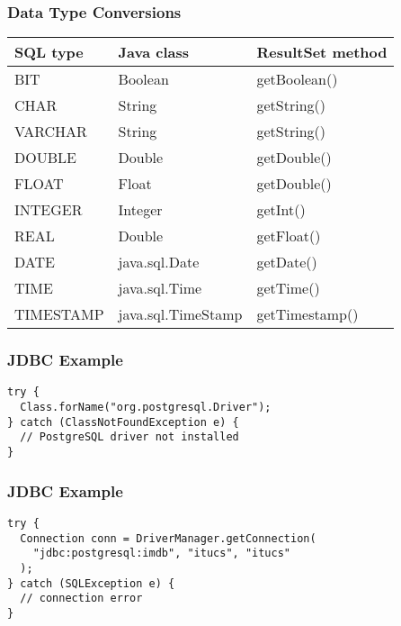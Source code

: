 \documentclass[dvipsnames]{beamer}
\theoremstyle{plain}
\begin{document}
\begin{frame}
  \frametitle{Data Type Conversions}

  \begin{table}
    \begin{tabular}{|l|l|l|}\hline
SQL type  & Java class         & ResultSet method\\\hline\hline
BIT       & Boolean            & getBoolean()    \\\hline
CHAR      & String             & getString()     \\\hline
VARCHAR   & String             & getString()     \\\hline
DOUBLE    & Double             & getDouble()     \\\hline
FLOAT     & Float              & getDouble()     \\\hline
INTEGER   & Integer            & getInt()        \\\hline
REAL      & Double             & getFloat()      \\\hline
DATE      & java.sql.Date      & getDate()       \\\hline
TIME      & java.sql.Time      & getTime()       \\\hline
TIMESTAMP & java.sql.TimeStamp & getTimestamp()  \\\hline
    \end{tabular}
  \end{table}
\end{frame}

\begin{frame}[fragile]
  \frametitle{JDBC Example}

  \begin{example}
    \begin{lstlisting}
try {
  Class.forName("org.postgresql.Driver");
} catch (ClassNotFoundException e) {
  // PostgreSQL driver not installed
}
    \end{lstlisting}
  \end{example}
\end{frame}

\begin{frame}[fragile]
  \frametitle{JDBC Example}

  \begin{example}[connecting]
    \begin{lstlisting}
try {
  Connection conn = DriverManager.getConnection(
    "jdbc:postgresql:imdb", "itucs", "itucs"
  );
} catch (SQLException e) {
  // connection error
}
    \end{lstlisting}
  \end{example}
\end{frame}
\end{document}
